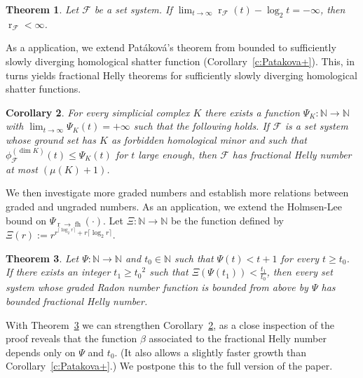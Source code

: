 \documentclass[11pt]{article}
\newcommand{\N}{\mathbb{N}}
\newcommand{\F}{\mathcal{F}}
\DeclareMathOperator{\rad}{r}
\DeclareMathOperator{\fh}{fh}
\newcommand{\pth}[1]{\left(#1\right)}
\newtheorem{theorem}{Theorem}
\newtheorem{corollary}[theorem]{Corollary}
\begin{document}
%
\begin{theorem}\label{t:radgrowth}
  Let $\F$ be a set system. If $\lim_{t \to \infty} \rad_\F(t) - \log_2 t = -\infty$, then $\rad_\F < \infty$.
\end{theorem}
%
\noindent
As a application, we extend Patáková's theorem from bounded to sufficiently slowly diverging homological shatter function (Corollary~\ref{c:Patakova+}). This, in turns yields fractional Helly theorems for sufficiently slowly diverging homological shatter functions.
%
\begin{corollary}\label{c:itgrows!}
  For every simplicial complex $K$ there exists a function $\Psi_K : \N \to \N$ with $\lim_{t \to \infty} \Psi_K(t) = +\infty$ such that the following holds. If $\F$ is a set system whose ground set has $K$ as forbidden homological minor and such that $\phi_{\F}^{(\dim K)}(t) \le \Psi_K(t)$ for $t$ large enough, then $\F$ has fractional Helly number at most $(\mu(K)+1)$.
\end{corollary}
%
\medskip
%
We then investigate more graded numbers and establish more relations between graded and ungraded numbers. As an application, we extend the Holmsen-Lee bound on $\Psi_{\rad \to \fh}(\cdot)$. Let $\Xi: \N \to \N$ be the function defined by $\Xi(r) := r^{r^{\lceil \log_2r \rceil}+r\lceil \log_2r \rceil}$. 
%
\begin{theorem}\label{t:radgrowth2}
  Let $\Psi: \N\rightarrow \N$ and $t_0 \in \N$ such that $\Psi(t) < t+1$ for every $t \ge t_0$. If there exists an integer $t_1 \ge {t_0}^2$ such that $\Xi\pth{\Psi(t_1)} < \frac{t_1}{t_0}$, then every set system whose graded Radon number function is bounded from above by $\Psi$ has bounded fractional Helly number.
\end{theorem}
%
\noindent
With Theorem~\ref{t:radgrowth2} we can strengthen Corollary~\ref{c:itgrows!}, as a close inspection of the proof reveals that the function $\beta$ associated to the fractional Helly number depends only on $\Psi$ and $t_0$. (It also allows a slightly faster growth than Corollary~\ref{c:Patakova+}.) We postpone this to the full version of the paper.
%
%
\end{document}
